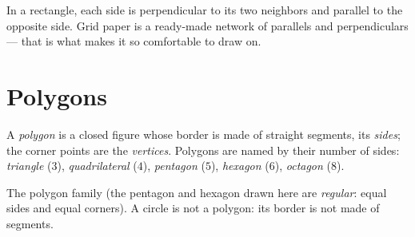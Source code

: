 \begin{example}\label{ex:g4:geometry:spot}
In a rectangle, each side is perpendicular to its two neighbors and
parallel to the opposite side. Grid paper is a ready-made network of
parallels and perpendiculars --- that is what makes it so
comfortable to draw on.
\end{example}

\section{Polygons}

\begin{definition}[Polygon]\label{def:g4:geometry:polygon}
A \emph{polygon} is a closed figure whose border is
made of straight segments, its \emph{sides}; the corner points are
the \emph{vertices}. Polygons are named by their number of sides:
\emph{triangle} ($3$), \emph{quadrilateral} ($4$),
\emph{pentagon} ($5$), \emph{hexagon} ($6$), \emph{octagon}
($8$).
\end{definition}

\begin{omfigure}

{\small The polygon family (the pentagon and hexagon drawn here are
\emph{regular}: equal sides and equal corners). A circle is not a
polygon: its border is not made of segments.}
\end{omfigure}

